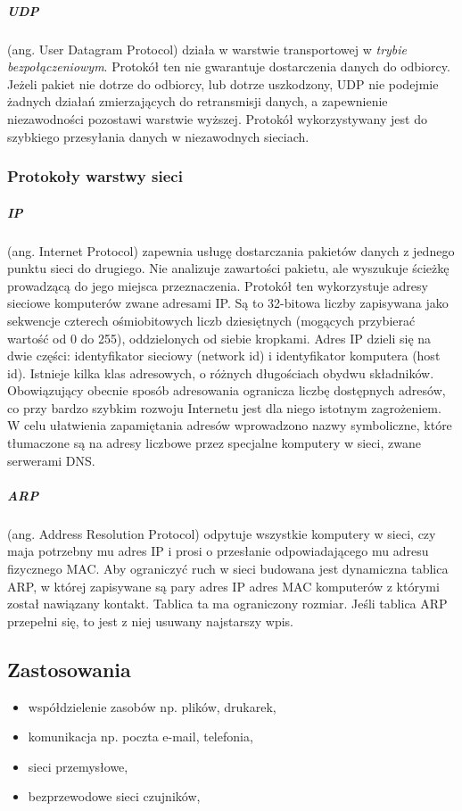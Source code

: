 \documentclass[]{report}
\begin{document}
\subparagraph{UDP} (ang. User   Datagram   Protocol)   działa    w    warstwie    transportowej   w   \emph{trybie bezpołączeniowym}.  Protokół  ten  nie  gwarantuje  dostarczenia  danych  do  odbiorcy.  Jeżeli  pakiet  nie dotrze  do  odbiorcy,  lub  dotrze  uszkodzony,  UDP  nie podejmie żadnych  działań  zmierzających  do retransmisji  danych,  a  zapewnienie  niezawodności  pozostawi  warstwie  wyższej.   Protokół wykorzystywany jest do szybkiego przesyłania danych w niezawodnych sieciach. 





\subsubsection{Protokoły warstwy sieci}

\medskip 
\subparagraph{IP} (ang. Internet Protocol) zapewnia usługę dostarczania pakietów danych z jednego punktu sieci do drugiego. Nie analizuje zawartości pakietu, ale wyszukuje ścieżkę prowadzącą do jego miejsca przeznaczenia. Protokół ten wykorzystuje adresy sieciowe komputerów zwane adresami IP. Są to 32-bitowa liczby zapisywana jako sekwencje czterech ośmiobitowych liczb dziesiętnych (mogących przybierać wartość od 0 do 255), oddzielonych od siebie kropkami. Adres IP dzieli się na dwie części: identyfikator sieciowy (network id) i identyfikator komputera (host id). Istnieje kilka klas adresowych, o różnych długościach obydwu składników. Obowiązujący obecnie sposób adresowania ogranicza liczbę dostępnych adresów, co przy bardzo szybkim rozwoju Internetu jest dla niego istotnym zagrożeniem. W celu ułatwienia zapamiętania adresów wprowadzono nazwy symboliczne, które tłumaczone są na adresy liczbowe przez specjalne komputery w sieci, zwane serwerami DNS.

\subparagraph{ARP} (ang. Address Resolution Protocol) odpytuje wszystkie komputery w sieci, czy maja potrzebny mu adres IP i prosi o przesłanie odpowiadającego mu adresu fizycznego MAC. Aby ograniczyć ruch w sieci budowana jest dynamiczna tablica ARP, w której zapisywane są pary adres IP adres MAC komputerów z którymi został nawiązany kontakt. Tablica ta ma ograniczony rozmiar. Jeśli tablica ARP przepełni się, to jest z niej usuwany najstarszy wpis.

\subsection{Zastosowania}
\medskip 
\begin{itemize}
\item współdzielenie zasobów np. plików, drukarek,
\item komunikacja np. poczta e-mail, telefonia,
\item sieci przemysłowe,
\item bezprzewodowe sieci czujników,
\end{itemize}
\end{document}
